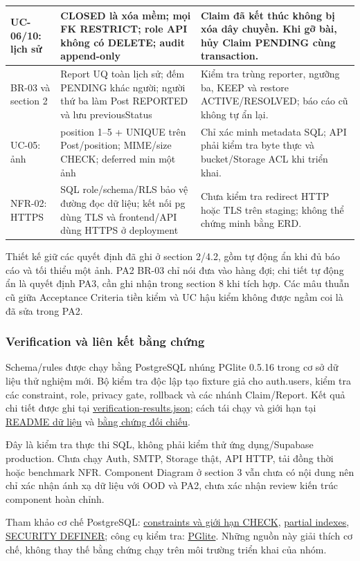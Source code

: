\begin{longtable}{|>{\raggedright\arraybackslash}p{.21\linewidth}|>{\raggedright\arraybackslash}p{.46\linewidth}|>{\raggedright\arraybackslash}p{.25\linewidth}|}
UC-06/10: lịch sử & CLOSED là xóa mềm; mọi FK RESTRICT; role API không có DELETE; audit append-only & Claim đã kết thúc không bị xóa dây chuyền. Khi gỡ bài, hủy Claim PENDING cùng transaction. \\ \hline
BR-03 và section 2 & Report UQ toàn lịch sử; đếm PENDING khác người; người thứ ba làm Post REPORTED và lưu previousStatus & Kiểm tra trùng reporter, ngưỡng ba, KEEP và restore ACTIVE/RESOLVED; báo cáo cũ không tự ẩn lại. \\ \hline
UC-05: ảnh & position 1--5 + UNIQUE trên Post/position; MIME/size CHECK; deferred min một ảnh & Chỉ xác minh metadata SQL; API phải kiểm tra byte thực và bucket/Storage ACL khi triển khai. \\ \hline
NFR-02: HTTPS & SQL role/schema/RLS bảo vệ đường đọc dữ liệu; kết nối pg dùng TLS và frontend/API dùng HTTPS ở deployment & Chưa kiểm tra redirect HTTP hoặc TLS trên staging; không thể chứng minh bằng ERD. \\ \hline
\end{longtable}

Thiết kế giữ các quyết định đã ghi ở section 2/4.2, gồm tự động ẩn khi đủ báo cáo và tối thiểu một ảnh. PA2 BR-03 chỉ nói đưa vào hàng đợi; chi tiết tự động ẩn là quyết định PA3, cần ghi nhận trong section 8 khi tích hợp. Các mâu thuẫn cũ giữa Acceptance Criteria tiền kiểm và UC hậu kiểm không được ngầm coi là đã sửa trong PA2.

\subsubsection{Verification và liên kết bằng chứng}
Schema/rules được chạy bằng PostgreSQL nhúng PGlite 0.5.16 trong cơ sở dữ liệu thử nghiệm mới. Bộ kiểm tra độc lập tạo fixture giả cho auth.users, kiểm tra các constraint, role, privacy gate, rollback và các nhánh Claim/Report. Kết quả chi tiết được ghi tại \href{run:../../../docs/design/database/verification-results.json}{verification-results.json}; cách tái chạy và giới hạn tại \href{run:../../../docs/design/database/README.md}{README dữ liệu} và \href{run:../../../docs/design/database/evidence.md}{bằng chứng đối chiếu}.

Đây là kiểm tra thực thi SQL, không phải kiểm thử ứng dụng/Supabase production. Chưa chạy Auth, SMTP, Storage thật, API HTTP, tải đồng thời hoặc benchmark NFR. Component Diagram ở section 3 vẫn chưa có nội dung nên chỉ xác nhận ánh xạ dữ liệu với OOD và PA2, chưa xác nhận review kiến trúc component hoàn chỉnh.

Tham khảo cơ chế PostgreSQL: \href{https://www.postgresql.org/docs/current/ddl-constraints.html}{constraints và giới hạn CHECK}, \href{https://www.postgresql.org/docs/current/indexes-partial.html}{partial indexes}, \href{https://www.postgresql.org/docs/current/sql-createfunction.html}{SECURITY DEFINER}; công cụ kiểm tra: \href{https://pglite.dev/docs/}{PGlite}. Những nguồn này giải thích cơ chế, không thay thế bằng chứng chạy trên môi trường triển khai của nhóm.
